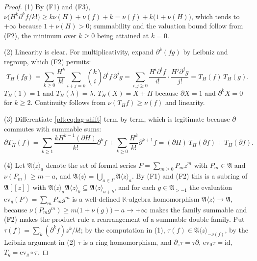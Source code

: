 \documentclass[11pt,oneside]{article}
\theoremstyle{plain}
\theoremstyle{definition}
\theoremstyle{remark}
\newcommand{\K}{\mathbb{K}}
\newcommand{\compose}{\mathbin{\circ}}
\begin{document}
\begin{proof}
(1)  By (F1) and (F3),
\(\nu\bigl(H^k\partial^kf/k!\bigr)\ge k\nu(H)+\nu(f)+k
=\nu(f)+k\bigl(1+\nu(H)\bigr)\), which tends to \(+\infty\) because
\(1+\nu(H)>0\); summability and the valuation bound follow from (F2), the
minimum over \(k\ge0\) being attained at \(k=0\).

(2) Linearity is clear.  For multiplicativity, expand \(\partial^k(fg)\) by
Leibniz and regroup, which (F2) permits:
\[
  T_H(fg)=\sum_{k\ge0}\frac{H^k}{k!}\sum_{i+j=k}\binom{k}{i}\partial^if\,\partial^jg
        =\sum_{i,j\ge0}\frac{H^i\partial^if}{i!}\cdot\frac{H^j\partial^jg}{j!}
        =T_H(f)\,T_H(g).
\]
\(T_H(1)=1\) and \(T_H(\lambda)=\lambda\).  \(T_H(X)=X+H\) because
\(\partial X=1\) and \(\partial^kX=0\) for \(k\ge2\).  Continuity follows from
\(\nu(T_Hf)\ge\nu(f)\) and linearity.

(3)  Differentiate \cref{plt:eq:lag-shift} term by term, which is legitimate
because \(\partial\) commutes with summable sums:
\[
  \partial T_H(f)
  =\sum_{k\ge1}\frac{kH^{k-1}(\partial H)}{k!}\partial^kf
   +\sum_{k\ge0}\frac{H^k}{k!}\partial^{k+1}f
  =(\partial H)\,T_H(\partial f)+T_H(\partial f).
\]

(4)  Let \(\mathfrak A\langle z\rangle_a\) denote the set of formal series
\(P=\sum_{m\ge0}P_mz^m\) with \(P_m\in\mathfrak A\) and \(\nu(P_m)\ge m-a\),
and \(\mathfrak A\langle z\rangle=\bigcup_{a\in\Gamma}\mathfrak A\langle
z\rangle_a\).  By (F1) and (F2) this is a subring of \(\mathfrak A[[z]]\) with
\(\mathfrak A\langle z\rangle_a\mathfrak A\langle z\rangle_b\subseteq\mathfrak
A\langle z\rangle_{a+b}\), and for each \(g\in\mathfrak A_{>-1}\) the
evaluation \(\mathrm{ev}_g(P)=\sum_mP_mg^m\) is a well-defined \(\K\)-algebra
homomorphism \(\mathfrak A\langle z\rangle\to\mathfrak A\), because
\(\nu(P_mg^m)\ge m\bigl(1+\nu(g)\bigr)-a\to+\infty\) makes the family summable
and (F2) makes the product rule a rearrangement of a summable double family.
Put \(\tau(f)=\sum_k(\partial^kf)z^k/k!\); by the computation in (1),
\(\tau(f)\in\mathfrak A\langle z\rangle_{-\nu(f)}\), by the Leibniz argument in
(2) \(\tau\) is a ring homomorphism, and \(\partial_z\tau=\tau\partial\),
\(\mathrm{ev}_0\tau=\mathrm{id}\), \(T_g=\mathrm{ev}_g\compose\tau\).


\end{proof}
\end{document}
